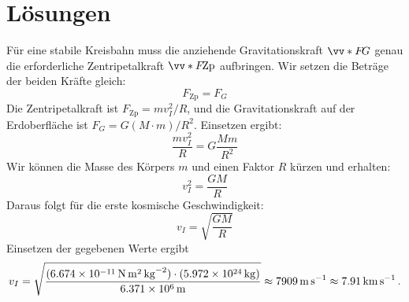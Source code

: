 \documentclass[ngerman]{scrreprt}
\newenvironment{loesungbox}[1]
  {\needspace{5\baselineskip}\begin{loesungboxstyle}[frametitle={#1}]}
  {\end{loesungboxstyle}}
\begin{document}
\newpage
\section{Lösungen}\label{sec: arbeit_energie_loesungen}

\begin{loesungbox}{Lösung zu \Cref{aufg:erste_kosmische}}
Für eine stabile Kreisbahn muss die anziehende Gravitationskraft $\ivecS{F}{G}$ genau die erforderliche Zentripetalkraft $\ivecS{F}{\text{Zp}}$ aufbringen. Wir setzen die Beträge der beiden Kräfte gleich:
\begin{equation}
    F_{\text{Zp}} = F_G
\end{equation}
Die Zentripetalkraft ist $F_{\text{Zp}} = mv_I^2 /R$, und die Gravitationskraft auf der Erdoberfläche ist $F_G = G (M\cdot m)/R^2$. Einsetzen ergibt:
\begin{equation}
    \frac{m v_I^2}{R} = G \frac{Mm}{R^2}
\end{equation}
Wir können die Masse des Körpers $m$ und einen Faktor $R$ kürzen und erhalten:
\begin{equation}
    v_I^2 = \frac{GM}{R}
\end{equation}
Daraus folgt für die erste kosmische Geschwindigkeit:
\begin{equation}\label{eq: v_kosmisch_1}
    v_I = \sqrt{\frac{GM}{R}}
\end{equation}
Einsetzen der gegebenen Werte ergibt
\begin{equation}
    v_I = \sqrt{\frac{(\SI{6.674e-11}{\newton\meter\squared\per\kilo\gram\squared}) \cdot (\SI{5.972e24}{\kilo\gram})}{\SI{6.371e6}{\meter}}} \approx \SI{7909}{\meter\per\second} \approx \SI{7.91}{\kilo\meter\per\second} \,.
\end{equation}
\end{loesungbox}
\end{document}
